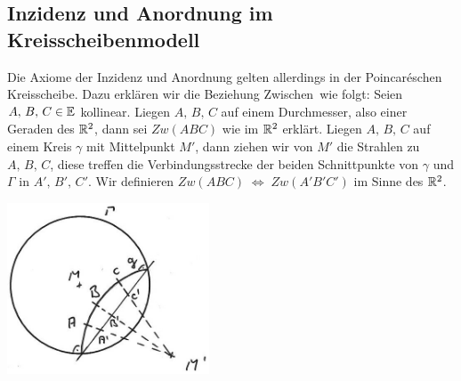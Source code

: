 \subsection*{Inzidenz und Anordnung im Kreisscheibenmodell}



Die Axiome der Inzidenz und Anordnung gelten allerdings in der Poincar\'eschen Kreisscheibe.
Dazu erklären wir die Beziehung \glqq Zwischen\grqq\ wie folgt:
Seien $A,\,B,\,C\in\mathbb E$ kollinear. Liegen $A,\,B,\,C$ auf einem Durchmesser, also einer
Geraden des $\mathbb R^2$, dann sei $Zw(ABC)$ wie im $\mathbb R^2$ erkl\"{a}rt.
Liegen $A,\,B,\,C$ auf einem Kreis $\gamma$ mit Mittelpunkt $M'$,
dann ziehen wir von $M'$ die Strahlen zu $A,\,B,\,C$, diese
treffen die Verbindungsstrecke der beiden Schnittpunkte von
$\gamma$ und $\Gamma$ in $A',\,B',\,C'$.
Wir definieren
 $Zw(ABC)\;\Leftrightarrow\;Zw(A'B'C')$ im Sinne des $\mathbb R^2$.


\centerline{\includegraphics[width=6cm]{BILDER/4-2-07-Zwischen.jpg}}




